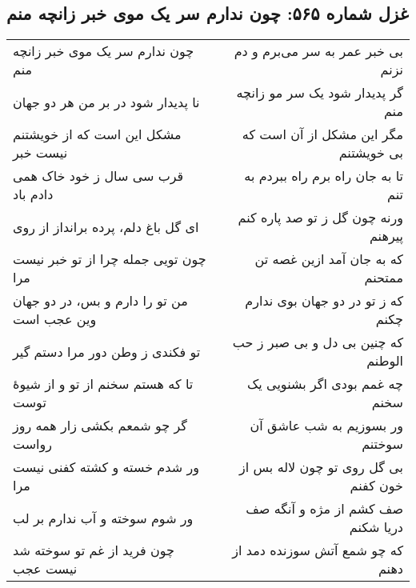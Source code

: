 \begin{center}
\section*{غزل شماره ۵۶۵: چون ندارم سر یک موی خبر زانچه منم}
\label{sec:565}
\begin{longtable}{l p{0.5cm} r}
چون ندارم سر یک موی خبر زانچه منم
&&
بی خبر عمر به سر می‌برم و دم نزنم
\\
نا پدیدار شود در بر من هر دو جهان
&&
گر پدیدار شود یک سر مو زانچه منم
\\
مشکل این است که از خویشتنم نیست خبر
&&
مگر این مشکل از آن است که بی خویشتنم
\\
قرب سی سال ز خود خاک همی دادم باد
&&
تا به جان راه برم راه ببردم به تنم
\\
ای گل باغ دلم، پرده برانداز از روی
&&
ورنه چون گل ز تو صد پاره کنم پیرهنم
\\
چون تویی جمله چرا از تو خبر نیست مرا
&&
که به جان آمد ازین غصه تن ممتحنم
\\
من تو را دارم و بس، در دو جهان وین عجب است
&&
که ز تو در دو جهان بوی ندارم چکنم
\\
تو فکندی ز وطن دور مرا دستم گیر
&&
که چنین بی دل و بی صبر ز حب الوطنم
\\
تا که هستم سخنم از تو و از شیوهٔ توست
&&
چه غمم بودی اگر بشنویی یک سخنم
\\
گر چو شمعم بکشی زار همه روز رواست
&&
ور بسوزیم به شب عاشق آن سوختنم
\\
ور شدم خسته و کشته کفنی نیست مرا
&&
بی گل روی تو چون لاله بس از خون کفنم
\\
ور شوم سوخته و آب ندارم بر لب
&&
صف کشم از مژه و آنگه صف دریا شکنم
\\
چون فرید از غم تو سوخته شد نیست عجب
&&
که چو شمع آتش سوزنده دمد از دهنم
\\
\end{longtable}
\end{center}
